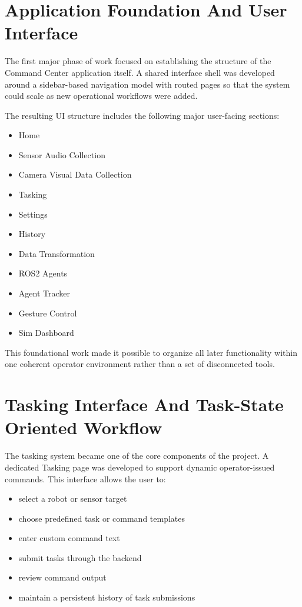 \documentclass[11pt]{article}
\begin{document}
\section{Application Foundation And User Interface}

The first major phase of work focused on establishing the structure of the Command Center application itself. A shared interface shell was developed around a sidebar-based navigation model with routed pages so that the system could scale as new operational workflows were added.

The resulting UI structure includes the following major user-facing sections:

\begin{itemize}
  \item Home
  \item Sensor Audio Collection
  \item Camera Visual Data Collection
  \item Tasking
  \item Settings
  \item History
  \item Data Transformation
  \item ROS2 Agents
  \item Agent Tracker
  \item Gesture Control
  \item Sim Dashboard
\end{itemize}

This foundational work made it possible to organize all later functionality within one coherent operator environment rather than a set of disconnected tools.

\section{Tasking Interface And Task-State Oriented Workflow}

The tasking system became one of the core components of the project. A dedicated Tasking page was developed to support dynamic operator-issued commands. This interface allows the user to:

\begin{itemize}
  \item select a robot or sensor target
  \item choose predefined task or command templates
  \item enter custom command text
  \item submit tasks through the backend
  \item review command output
  \item maintain a persistent history of task submissions
\end{itemize}
\end{document}
